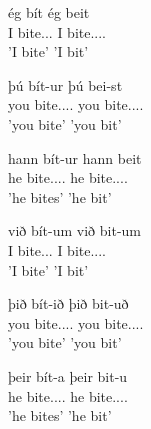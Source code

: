 \documentclass[12pt,%
    times,
]{lin-v2/lin}
\begin{document}
\begin{exe}
    \ex \begin{xlist}
        \item \gll ég bít ég beit\\
                   I bite.\First\Sg.\Prs.\Ind{} I bite.\First.\Sg.\Pst.\Ind\\
              \trans 'I bite' 'I bit'
        \item \gll þú bít-ur þú bei-st\\
                   you bite.\Second.\Sg.\Prs.\Ind{} you bite.\Second.\Sg.\Pst.\Ind\\
              \trans 'you bite' 'you bit'
        \item \gll hann bít-ur hann beit\\
                   he bite.\Third.\Sg.\Prs.\Ind{} he bite.\Third.\Sg.\Pst.\Ind\\
              \trans 'he bites' 'he bit'
        \item \gll við bít-um við bit-um\\
                   I bite.\First\Pl.\Prs.\Ind{} I bite.\First.\Pl.\Pst.\Ind\\
              \trans 'I bite' 'I bit'
        \item \gll þið bít-ið þið bit-uð\\
                   you bite.\Second.\Pl.\Prs.\Ind{} you bite.\Second.\Pl.\Pst.\Ind\\
              \trans 'you bite' 'you bit'
        \item \gll þeir bít-a þeir bit-u\\
                   he bite.\Third.\Pl.\Prs.\Ind{} he bite.\Third.\Pl.\Pst.\Ind\\
              \trans 'he bites' 'he bit'
        \end{xlist}
\end{exe}
\end{document}
